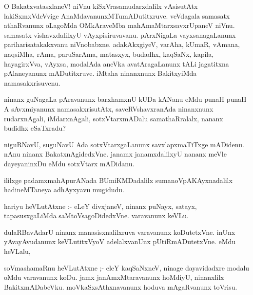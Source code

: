 \documentclass{article}
\begin{document}
\begin{mn}
O BakatxvatasxlaneV!  niVnu kiSxVrasamudarxdalilx  vAsisutAtx lakiSxmxVdeVvige  
AnaMdavanunxMTumADutitxruve. veVdagala  samasatx athaRvanunx  oLagoMda 
OMkAraveMba mahAmaMtarxsavxrUpaneV niVnu. samasatx vishavxdalilxyU vAyxpisiruvavanu. 
pArxNigaLa vayxsanagaLanunx pariharisatakakxvanu  niVnobabxne. adakAkxgiyeV, 
varAha, kUmaR, vAmana, naqsiMha, rAma, paruSarAma, matasxyx, budadhx, kaqSaNx, 
kapila, hayagirxVva, vAyxsa, modalAda aneVka avatAragaLanunx tALi  jagatitxna 
pAlaneyanunx mADutitxruve. iMtaha ninanxnunx BakitxyiMda namasakxrisuvenu.
\end{mn}

\begin{mn}
ninanx guNagaLa pAravanunx  barxhamxnU kUDa kANanu eMdu punaH punaH A sAvxmiyanunx 
namasakxrisutAtx, saveRVshavxranAda ninanxnunx rudarxnAgali, iMdarxnAgali, 
sotxVtarxmADalu samathaRralalx, nananx budidhx eSaTxradu?
\end{mn}

\begin{mn}
niguRNavU, suguNavU Ada sotxVtarxgaLanunx savxlapxmaTiTxge mADidenu. 
nAnu ninanx BakatxnAgidedxVne. janamx janamxdalilxyU nananx meVle 
dayeyaninxDu eMdu sotxVtarx mADidanu.
\end{mn}

\begin{mn}
ililxge padamxmahApurANada BUmiKMDadalilx sumanoVpAKAyxnadalilx hadineMTaneya adhAyxyavu mugidudu.
\end{mn}


\begin{mn}
hariyu heVLutAtxne :- eLeY divxjaneV, ninanx puNayx, satayx, tapasusxgaLiMda 
saMtoVsagoDidedxVne. varavanunx keVLu. 
\end{mn}

\begin{mn}
dulaRBavAdarU ninanx manasisxnalilxruva  varavanunx  koDutetxVne. inUnx 
yAvayAvudanunx  keVLutitxVyoV adelalxvanUnx pUtiRmADutetxVne. eMdu heVLalu,
\end{mn}

\begin{mn}
soVmashamaRnu heVLutAtxne ;- eleY kaqSaNxneV, ninage dayavidadxre modalu 
oMdu varavanunx koDu. jamx janAmxMtaravanunx hoMdiyU, ninanxlilx 
BakitxmADabeVku. moVkaSxsAthxnavanunx hoduva mAgaRvanunx toVrisu.
\end{mn}
\end{document}
